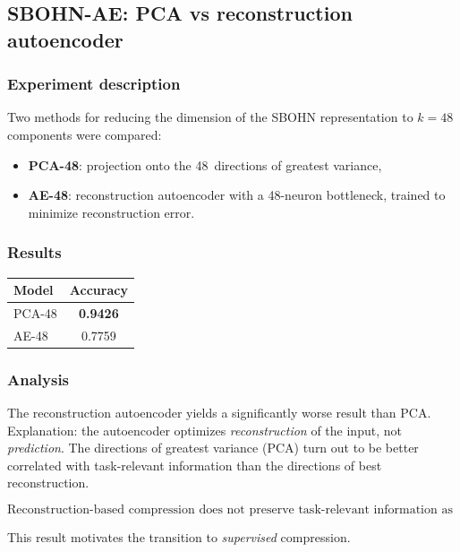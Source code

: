 \subsection{SBOHN-AE: PCA vs reconstruction autoencoder}

\subsubsection{Experiment description}

Two methods for reducing the dimension of the SBOHN representation to $k=48$ components were compared:
\begin{itemize}
\item \textbf{PCA-48}: projection onto the 48~directions of greatest variance,
\item \textbf{AE-48}: reconstruction autoencoder with a 48-neuron bottleneck, trained to minimize reconstruction error.
\end{itemize}

\subsubsection{Results}

\begin{center}
\begin{tabular}{lc}
\toprule
Model & Accuracy \\
\midrule
PCA-48 & \textbf{0.9426} \\
AE-48 & 0.7759 \\
\bottomrule
\end{tabular}
\end{center}

\subsubsection{Analysis}

The reconstruction autoencoder yields a significantly worse result than PCA. Explanation: the autoencoder optimizes \emph{reconstruction} of the input, not \emph{prediction}. The directions of greatest variance (PCA) turn out to be better correlated with task-relevant information than the directions of best reconstruction.

\[
\boxed{\text{Reconstruction-based compression does not preserve task-relevant information as well as PCA.}}
\]

This result motivates the transition to \emph{supervised} compression.

